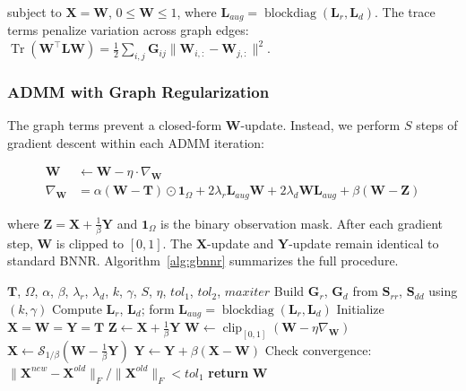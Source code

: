 \documentclass[unnumsec,webpdf,contemporary,large]{oup-authoring-template}
\DeclareMathOperator{\clip}{clip}
\DeclareMathOperator{\blockdiag}{blockdiag}
\begin{document}
subject to $\mathbf{X} = \mathbf{W}$, $0 \leq \mathbf{W} \leq 1$, where $\mathbf{L}_{aug} = \blockdiag(\mathbf{L}_r, \mathbf{L}_d)$. The trace terms penalize variation across graph edges: $\operatorname{Tr}(\mathbf{W}^\top \mathbf{L} \mathbf{W}) = \frac{1}{2}\sum_{i,j} \mathbf{G}_{ij} \|\mathbf{W}_{i,:} - \mathbf{W}_{j,:}\|^2$.

\subsubsection{ADMM with Graph Regularization}
\label{sec:gbnnr_admm}

The graph terms prevent a closed-form $\mathbf{W}$-update. Instead, we perform $S$ steps of gradient descent within each ADMM iteration:

\begin{align}
\mathbf{W} &\leftarrow \mathbf{W} - \eta \cdot \nabla_{\mathbf{W}} \label{eq:gbnnr_gd} \\
\nabla_{\mathbf{W}} &= \alpha(\mathbf{W} - \mathbf{T}) \odot \mathbf{1}_\Omega + 2\lambda_r \mathbf{L}_{aug}\mathbf{W} + 2\lambda_d \mathbf{W}\mathbf{L}_{aug} + \beta(\mathbf{W} - \mathbf{Z}) \label{eq:gbnnr_gradient}
\end{align}

where $\mathbf{Z} = \mathbf{X} + \frac{1}{\beta}\mathbf{Y}$ and $\mathbf{1}_\Omega$ is the binary observation mask. After each gradient step, $\mathbf{W}$ is clipped to $[0, 1]$. The $\mathbf{X}$-update and $\mathbf{Y}$-update remain identical to standard BNNR. Algorithm~\ref{alg:gbnnr} summarizes the full procedure.

\begin{algorithm}[t]
\caption{GBNNR}
\label{alg:gbnnr}
\begin{algorithmic}[1]
\Require $\mathbf{T}$, $\Omega$, $\alpha$, $\beta$, $\lambda_r$, $\lambda_d$, $k$, $\gamma$, $S$, $\eta$, $tol_1$, $tol_2$, $maxiter$
\State Build $\mathbf{G}_r$, $\mathbf{G}_d$ from $\mathbf{S}_{rr}$, $\mathbf{S}_{dd}$ using $(k, \gamma)$
\State Compute $\mathbf{L}_r$, $\mathbf{L}_d$; form $\mathbf{L}_{aug} = \blockdiag(\mathbf{L}_r, \mathbf{L}_d)$
\State Initialize $\mathbf{X} = \mathbf{W} = \mathbf{Y} = \mathbf{T}$
    \State $\mathbf{Z} \leftarrow \mathbf{X} + \frac{1}{\beta}\mathbf{Y}$
        \State $\mathbf{W} \leftarrow \clip_{[0,1]}(\mathbf{W} - \eta \nabla_{\mathbf{W}})$
    \EndFor
    \State $\mathbf{X} \leftarrow \mathcal{S}_{1/\beta}(\mathbf{W} - \frac{1}{\beta}\mathbf{Y})$
    \State $\mathbf{Y} \leftarrow \mathbf{Y} + \beta(\mathbf{X} - \mathbf{W})$
    \State Check convergence: $\|\mathbf{X}^{new} - \mathbf{X}^{old}\|_F / \|\mathbf{X}^{old}\|_F < tol_1$
\EndWhile
\State \textbf{return} $\mathbf{W}$
\end{algorithmic}
\end{algorithm}
\end{document}
